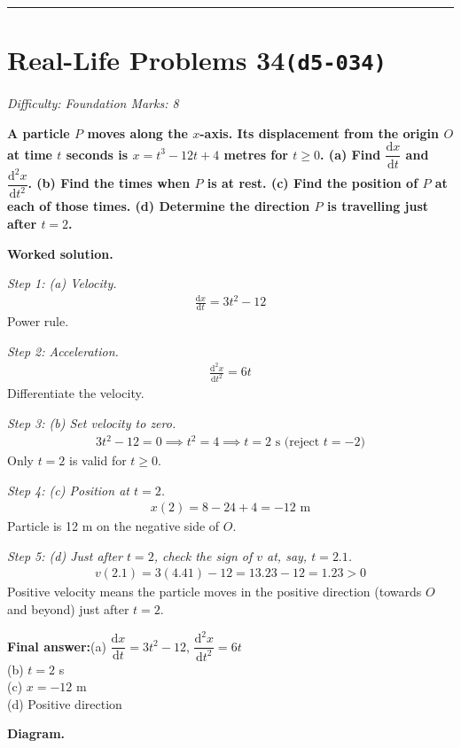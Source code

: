 \documentclass[11pt]{article}
\newcommand{\question}[1]{\par\medskip\noindent\textbf{#1}\par}
\begin{document}
\medskip\hrule

\section*{Real-Life Problems 34\quad\small\texttt{(d5-034)}}
\textit{Difficulty: Foundation \quad\textbar\quad Marks: 8}

\question{A particle \( P \) moves along the \( x \)-axis. Its displacement from the origin \( O \) at time \( t \) seconds is \( x = t^3 - 12t + 4 \) metres for \( t \geq 0 \). (a) Find \( \dfrac{\mathrm{d}x}{\mathrm{d}t} \) and \( \dfrac{\mathrm{d}^2x}{\mathrm{d}t^2} \). (b) Find the times when \( P \) is at rest. (c) Find the position of \( P \) at each of those times. (d) Determine the direction \( P \) is travelling just after \( t = 2 \).}

\textbf{Worked solution.}

\textit{Step 1: (a) Velocity.}
\[\begin{gathered}
\frac{\mathrm{d}x}{\mathrm{d}t} = 3t^2 - 12
\end{gathered}\]
Power rule.

\textit{Step 2: Acceleration.}
\[\begin{gathered}
\frac{\mathrm{d}^2x}{\mathrm{d}t^2} = 6t
\end{gathered}\]
Differentiate the velocity.

\textit{Step 3: (b) Set velocity to zero.}
\[\begin{gathered}
3t^2 - 12 = 0 \implies t^2 = 4 \implies t = 2 \text{ s (reject } t=-2\text{)}
\end{gathered}\]
Only \( t = 2 \) is valid for \( t \geq 0 \).

\textit{Step 4: (c) Position at \( t = 2 \).}
\[\begin{gathered}
x(2) = 8 - 24 + 4 = -12 \text{ m}
\end{gathered}\]
Particle is 12 m on the negative side of \( O \).

\textit{Step 5: (d) Just after \( t = 2 \), check the sign of \( v \) at, say, \( t = 2.1 \).}
\[\begin{gathered}
v(2.1) = 3(4.41) - 12 = 13.23 - 12 = 1.23 > 0
\end{gathered}\]
Positive velocity means the particle moves in the positive direction (towards \( O \) and beyond) just after \( t = 2 \).

\begin{answerbox}
\textbf{Final answer:}\quad (a) \(\displaystyle  \dfrac{\mathrm{d}x}{\mathrm{d}t} = 3t^2 - 12 \), \(\displaystyle  \dfrac{\mathrm{d}^2x}{\mathrm{d}t^2} = 6t \) \\[3pt]  (b) \(\displaystyle  t = 2 \) s \\[3pt]  (c) \(\displaystyle  x = -12 \) m \\[3pt]  (d) Positive direction
\end{answerbox}
\textbf{Diagram.}
\end{document}
